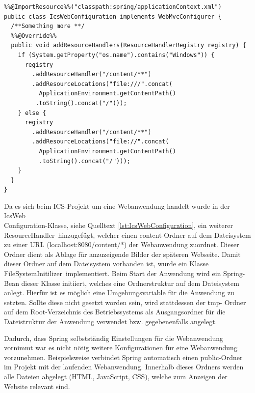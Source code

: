 \newpage

\begin{lstlisting}[caption={IcsWebConfiguration.java}, label={lst:IcsWebConfiguration}]
%%@Configuration%%
%%@ImportResource%%("classpath:spring/applicationContext.xml")
public class IcsWebConfiguration implements WebMvcConfigurer {
  /**Something more **/
  %%@Override%%
  public void addResourceHandlers(ResourceHandlerRegistry registry) {
    if (System.getProperty("os.name").contains("Windows")) {
	  registry
	    .addResourceHandler("/content/**")
		.addResourceLocations("file:///".concat(
		  ApplicationEnvironment.getContentPath()
		 .toString().concat("/")));
	} else {
	  registry
	    .addResourceHandler("/content/**")
		.addResourceLocations("file://".concat(
		  ApplicationEnvironment.getContentPath()
		  .toString().concat("/")));
	}
  }
}
\end{lstlisting}

	Da es sich beim \ac{ICS}-Projekt um eine Webanwendung handelt wurde in der \glqq IcsWeb\\Configuration\grqq -Klasse, siehe Quelltext \ref{lst:IcsWebConfiguration}, ein weiterer \glqq ResourceHandler\grqq \, hinzugefügt, welcher einen \glqq content\grqq-Ordner auf dem Dateisystem zu einer URL (\glqq localhost:8080/content/*\grqq) der Webanwendung zuordnet. Dieser Ordner dient als Ablage für anzuzeigende Bilder der späteren Webseite. Damit dieser Ordner auf dem Dateisystem vorhanden ist, wurde ein Klasse \glqq FileSystemInitilizer\grqq \, implementiert. Beim Start der Anwendung wird ein Spring-Bean dieser Klasse initiiert, welches eine Ordnerstruktur auf dem Dateisystem anlegt. Hierfür ist es möglich eine Umgebungsvariable für die Anwendung zu setzten. Sollte diese nicht gesetzt worden sein, wird stattdessen der \glqq tmp\grqq- Ordner auf dem Root-Verzeichnis des Betriebssystems als Ausgangsordner für die Dateistruktur der Anwendung verwendet bzw. gegebenenfalls angelegt.
	
	Dadurch, dass Spring selbstständig Einstellungen für die Webanwendung vornimmt war es nicht nötig weitere Konfigurationen für eine Webanwendung vorzunehmen. Beispielsweise verbindet Spring automatisch einen \glqq public\grqq-Ordner im Projekt mit der laufenden Webanwendung. Innerhalb dieses Ordners werden alle Dateien abgelegt (HTML, JavaScript, \acs{CSS}), welche zum Anzeigen der Website relevant sind.

